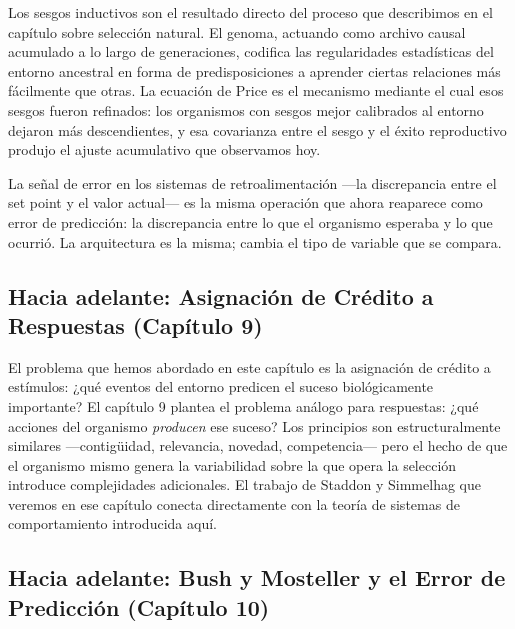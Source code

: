 \documentclass[
  letterpaper,
  DIV=11,
  numbers=noendperiod]{scrreprt}
\begin{document}
\begin{tcolorbox}[enhanced jigsaw, toprule=.15mm, arc=.35mm, colback=white, opacityback=0, colframe=quarto-callout-note-color-frame, breakable, rightrule=.15mm, left=2mm, leftrule=.75mm, bottomrule=.15mm]
Los sesgos inductivos son el resultado directo del proceso que
describimos en el capítulo sobre selección natural. El genoma, actuando
como archivo causal acumulado a lo largo de generaciones, codifica las
regularidades estadísticas del entorno ancestral en forma de
predisposiciones a aprender ciertas relaciones más fácilmente que otras.
La ecuación de Price es el mecanismo mediante el cual esos sesgos fueron
refinados: los organismos con sesgos mejor calibrados al entorno dejaron
más descendientes, y esa covarianza entre el sesgo y el éxito
reproductivo produjo el ajuste acumulativo que observamos hoy.

La señal de error en los sistemas de retroalimentación ---la
discrepancia entre el set point y el valor actual--- es la misma
operación que ahora reaparece como error de predicción: la discrepancia
entre lo que el organismo esperaba y lo que ocurrió. La arquitectura es
la misma; cambia el tipo de variable que se compara.

\subsection{Hacia adelante: Asignación de Crédito a Respuestas (Capítulo
9)}\label{hacia-adelante-asignaciuxf3n-de-cruxe9dito-a-respuestas-capuxedtulo-9}

El problema que hemos abordado en este capítulo es la asignación de
crédito a estímulos: ¿qué eventos del entorno predicen el suceso
biológicamente importante? El capítulo 9 plantea el problema análogo
para respuestas: ¿qué acciones del organismo \emph{producen} ese suceso?
Los principios son estructuralmente similares ---contigüidad,
relevancia, novedad, competencia--- pero el hecho de que el organismo
mismo genera la variabilidad sobre la que opera la selección introduce
complejidades adicionales. El trabajo de Staddon y Simmelhag que veremos
en ese capítulo conecta directamente con la teoría de sistemas de
comportamiento introducida aquí.

\subsection{Hacia adelante: Bush y Mosteller y el Error de Predicción
(Capítulo
10)}\label{hacia-adelante-bush-y-mosteller-y-el-error-de-predicciuxf3n-capuxedtulo-10}


\end{tcolorbox}
\end{document}
